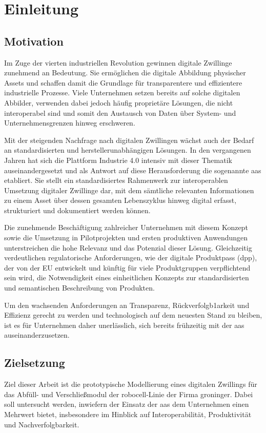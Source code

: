 \thispagestyle{fancy}
\section{Einleitung}
\subsection{Motivation}
\label{sec:Motivation}
Im Zuge der vierten industriellen Revolution gewinnen digitale Zwillinge zunehmend an Bedeutung. 
Sie ermöglichen die digitale Abbildung physischer Assets und schaffen damit die Grundlage für transparentere und effizientere industrielle Prozesse.
Viele Unternehmen setzen bereits auf solche digitalen Abbilder, verwenden dabei jedoch häufig proprietäre Lösungen, die nicht interoperabel sind und somit den Austausch von Daten über System- und Unternehmensgrenzen hinweg erschweren. 

Mit der steigenden Nachfrage nach digitalen Zwillingen wächst auch der Bedarf an standardisierten und herstellerunabhängigen Lösungen. 
In den vergangenen Jahren hat sich die Plattform Industrie 4.0 intensiv mit dieser Thematik auseinandergesetzt und als Antwort auf diese Herausforderung die sogenannte \ac{aas} etabliert.
Sie stellt ein standardisiertes Rahmenwerk zur interoperablen Umsetzung digitaler Zwillinge dar, mit dem sämtliche relevanten Informationen zu einem Asset über dessen gesamten Lebenszyklus hinweg digital erfasst, strukturiert und dokumentiert werden können.

Die zunehmende Beschäftigung zahlreicher Unternehmen mit diesem Konzept sowie die Umsetzung in Pilotprojekten und ersten produktiven Anwendungen unterstreichen die hohe Relevanz und das Potenzial dieser Lösung. 
Gleichzeitig verdeutlichen regulatorische Anforderungen, wie der digitale Produktpass (\acs{dpp}), der von der EU entwickelt und künftig für viele Produktgruppen verpflichtend sein wird, die Notwendigkeit eines einheitlichen Konzepts zur standardisierten und semantischen Beschreibung von Produkten.

Um den wachsenden Anforderungen an Transparenz, Rückverfolgb1arkeit und Effizienz gerecht zu werden und technologisch auf dem neuesten Stand zu bleiben, ist es für Unternehmen daher unerlässlich, sich bereits frühzeitig mit der \acs{aas} auseinanderzusetzen.

\subsection{Zielsetzung}
Ziel dieser Arbeit ist die prototypische Modellierung eines digitalen Zwillings für das Abfüll- und Verschließmodul der robocell-Linie der Firma groninger. 
Dabei soll untersucht werden, inwiefern der Einsatz der \acs{aas} dem Unternehmen einen Mehrwert bietet, insbesondere im Hinblick auf Interoperabilität, Produktivität und Nachverfolgbarkeit.

